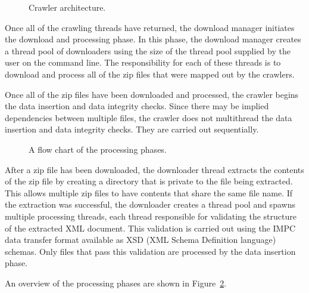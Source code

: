 \documentclass[a4paper,11pt]{article}
\begin{document}
\begin{figure}[htbp]
\centering
{}
\caption{Crawler architecture.\label{fig:crawler architecture}}
\end{figure}

Once all of the crawling threads have returned, the download manager initiates the download and processing phase. In this phase, the download manager creates a thread pool of downloaders using the size of the thread pool supplied by the user on the command line. The responsibility for each of these threads is to download and process all of the zip files that were mapped out by the crawlers.

Once all of the zip files have been downloaded and processed, the crawler begins the data insertion and data integrity checks. Since there may be implied dependencies between multiple files, the crawler does not multithread the data insertion and data integrity checks. They are carried out sequentially.

\begin{figure}[htbp]
\centering
{}
\caption{A flow chart of the processing phases.\label{fig:processing flowchart}}
\end{figure}

After a zip file has been downloaded, the downloader thread extracts the contents of the zip file by creating a directory that is private to the file being extracted. This allows multiple zip files to have contents that share the same file name. If the extraction was successful, the downloader creates a thread pool and spawns multiple processing threads, each thread responsible for validating the structure of the extracted XML document. This validation is carried out using the IMPC data transfer format available as XSD (XML Schema Definition language) schemas. Only files that pass this validation are processed by the data insertion phase.

An overview of the processing phases are shown in Figure~\ref{fig:processing flowchart}.
\end{document}
